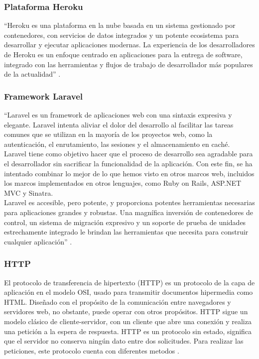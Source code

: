 \subsubsection{Plataforma Heroku}

``Heroku es una plataforma en la nube basada en un sistema gestionado por contenedores, con servicios de datos integrados y un potente ecosistema para desarrollar y ejecutar aplicaciones modernas. La experiencia de los desarrolladores de Heroku es un enfoque centrado en aplicaciones para la entrega de software, integrado con las herramientas y flujos de trabajo de desarrollador más populares de la actualidad'' \cite{Hero}.


\subsubsection{Framework Laravel}

``Laravel es un framework de aplicaciones web con una sintaxis expresiva y elegante. Laravel intenta aliviar el dolor del desarrollo al facilitar las tareas comunes que se utilizan en la mayoría de los proyectos web, como la autenticación, el enrutamiento, las sesiones y el almacenamiento en caché.\\

Laravel tiene como objetivo hacer que el proceso de desarrollo sea agradable para el desarrollador sin sacrificar la funcionalidad de la aplicación. Con este fin, se ha intentado combinar lo mejor de lo que hemos visto en otros marcos web, incluidos los marcos implementados en otros lenguajes, como Ruby on Rails, ASP.NET MVC y Sinatra.\\

Laravel es accesible, pero potente, y proporciona potentes herramientas necesarias para aplicaciones grandes y robustas. Una magnífica inversión de contenedores de control, un sistema de migración expresivo y un soporte de prueba de unidades estrechamente integrado le brindan las herramientas que necesita para construir cualquier aplicación'' \cite{Lara}.

\subsubsection{HTTP}

El protocolo de transferencia de hipertexto (HTTP) es un protocolo de la capa de aplicación en el modelo OSI, usado para transmitir documentos hipermedia como HTML. Diseñado con el propósito de la comunicación entre navegadores y servidores web, no obstante, puede operar con otros propósitos. HTTP sigue un modelo clásico de cliente-servidor, con un cliente que abre una conexión y realiza una petición a la espera de respuesta. HTTP es un protocolo sin estado, significa que el servidor no conserva ningún dato entre dos solicitudes. Para realizar las peticiones, este protocolo cuenta con diferentes metodos \cite{HTTP}.

